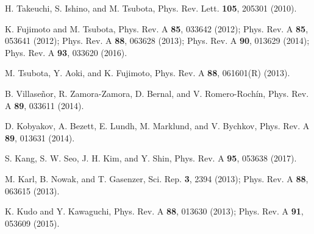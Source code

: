 \documentclass[pra,aps,superscriptaddress,twocolumn]{revtex4-2}
\begin{document}
\begin{thebibliography}{99}
H. Takeuchi, S. Ishino, and M. Tsubota,
Phys. Rev. Lett. \textbf{105}, 205301 (2010).

K. Fujimoto and M. Tsubota,
Phys. Rev. A \textbf{85}, 033642 (2012);
Phys. Rev. A \textbf{85}, 053641 (2012);
Phys. Rev. A \textbf{88}, 063628 (2013);
Phys. Rev. A \textbf{90}, 013629 (2014);
Phys. Rev. A \textbf{93}, 033620 (2016).

M. Tsubota, Y. Aoki, and K. Fujimoto,
Phys. Rev. A \textbf{88}, 061601(R) (2013).

B. Villase\~nor, R. Zamora-Zamora, D. Bernal, and V. Romero-Roch\'in,
Phys. Rev. A \textbf{89}, 033611 (2014).

D. Kobyakov, A. Bezett, E. Lundh, M. Marklund, and V. Bychkov,
Phys. Rev. A \textbf{89}, 013631 (2014).

S. Kang, S. W. Seo, J. H. Kim, and Y. Shin,
Phys. Rev. A \textbf{95}, 053638 (2017).

M. Karl, B. Nowak, and T. Gasenzer,
Sci. Rep. \textbf{3}, 2394 (2013);
Phys. Rev. A \textbf{88}, 063615 (2013).

K. Kudo and Y. Kawaguchi,
Phys. Rev. A \textbf{88}, 013630 (2013);
Phys. Rev. A \textbf{91}, 053609 (2015).


\end{thebibliography}
\end{document}
